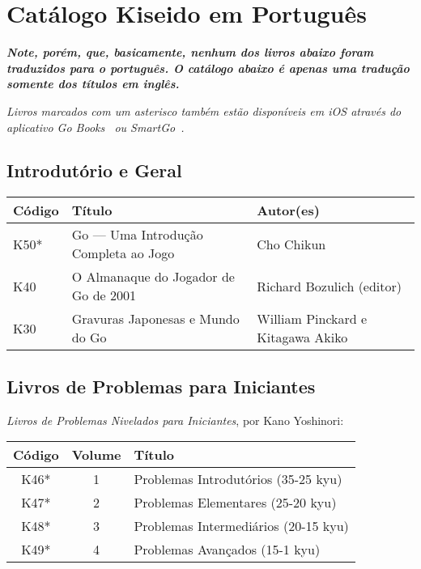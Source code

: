 \chapter{Catálogo Kiseido em Português}\label{ap:pt}

\textbf{\emph{Note, porém, que, basicamente, nenhum dos livros abaixo foram traduzidos para o português. O catálogo abaixo é apenas uma tradução somente dos títulos em inglês.}}

\bigskip

\emph{Livros marcados com um asterisco também estão disponíveis em iOS através do aplicativo Go Books~\cite{gobooks} ou SmartGo~\cite{smartgo}.}

\section{Introdutório e Geral}

\begin{longtable}{l|p{50mm}|p{50mm}} 
    \hline
    \textbf{Código} & \textbf{Título} & \textbf{Autor(es)} \\
    \hline \hline
    K50* & Go --- Uma Introdução Completa ao Jogo & Cho Chikun \\
    \hline
    K40 & O Almanaque do Jogador de Go de 2001 & Richard Bozulich (editor) \\
    \hline
    K30 & Gravuras Japonesas e Mundo do Go & William Pinckard e Kitagawa Akiko \\
    \hline
\end{longtable}


\section{Livros de Problemas para Iniciantes}

\emph{Livros de Problemas Nivelados para Iniciantes}, por Kano Yoshinori:

\begin{longtable}{c|c|l} 
    \hline
    \textbf{Código} & \textbf{Volume} & \textbf{Título} \\
    \hline \hline
    K46* & 1 & Problemas Introdutórios (35-25 kyu) \\
    \hline
    K47* & 2 & Problemas Elementares (25-20 kyu) \\
    \hline
    K48* & 3 & Problemas Intermediários (20-15 kyu) \\
    \hline
    K49* & 4 & Problemas Avançados (15-1 kyu) \\
    \hline
\end{longtable}


